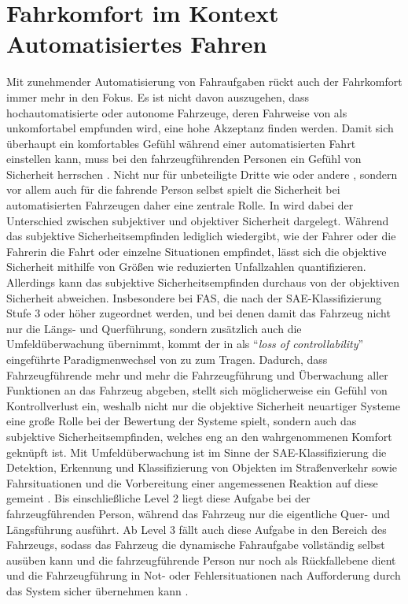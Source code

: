 \section{Fahrkomfort im Kontext Automatisiertes Fahren}\label{sec:fahrkomfort}
Mit zunehmender Automatisierung von Fahraufgaben rückt auch der Fahrkomfort immer mehr in den Fokus. Es ist nicht davon auszugehen, dass hochautomatisierte oder autonome Fahrzeuge, deren Fahrweise von  als unkomfortabel empfunden wird, eine hohe Akzeptanz finden werden. Damit sich überhaupt ein komfortables Gefühl während einer automatisierten Fahrt einstellen kann, muss bei den fahrzeugführenden Personen ein Gefühl von Sicherheit herrschen \cite{Festner.2019}. Nicht nur für unbeteiligte Dritte wie  oder andere , sondern vor allem auch für die fahrende Person selbst spielt die Sicherheit bei automatisierten Fahrzeugen daher eine zentrale Rolle. In \cite{Festner.2019} wird dabei der Unterschied zwischen subjektiver und objektiver Sicherheit dargelegt. Während das subjektive Sicherheitsempfinden lediglich wiedergibt, wie der Fahrer oder die Fahrerin die Fahrt oder einzelne Situationen empfindet, lässt sich die objektive Sicherheit mithilfe von Größen wie reduzierten Unfallzahlen quantifizieren. Allerdings kann das subjektive Sicherheitsempfinden durchaus von der objektiven Sicherheit abweichen. Insbesondere bei FAS, die nach der SAE-Klassifizierung \cite{SAETaxonomy.2018} Stufe 3 oder höher zugeordnet werden, und bei denen damit das Fahrzeug nicht nur die Längs- und Querführung, sondern zusätzlich auch die Umfeldüberwachung übernimmt, kommt der in \cite{Elbanhawi.2015} als ``\textit{loss of controllability}'' eingeführte Paradigmenwechsel von  zu  zum Tragen. Dadurch, dass Fahrzeugführende mehr und mehr die Fahrzeugführung und Überwachung aller Funktionen an das Fahrzeug abgeben, stellt sich möglicherweise ein Gefühl von Kontrollverlust ein, weshalb nicht nur die objektive Sicherheit neuartiger Systeme eine große Rolle bei der Bewertung der Systeme spielt, sondern auch das subjektive Sicherheitsempfinden, welches eng an den wahrgenommenen Komfort geknüpft ist. Mit Umfeldüberwachung ist im Sinne der SAE-Klassifizierung die Detektion, Erkennung und Klassifizierung von Objekten im Straßenverkehr sowie Fahrsituationen und die Vorbereitung einer angemessenen Reaktion auf diese gemeint \cite{SAETaxonomy.2018}. Bis einschließliche Level 2 liegt diese Aufgabe bei der fahrzeugführenden Person, während das Fahrzeug nur die eigentliche Quer- und Längsführung ausführt. Ab Level 3 fällt auch diese Aufgabe in den Bereich des Fahrzeugs, sodass das Fahrzeug die dynamische Fahraufgabe vollständig selbst ausüben kann und die fahrzeugführende Person nur noch als Rückfallebene dient und die Fahrzeugführung in Not- oder Fehlersituationen nach Aufforderung durch das System sicher übernehmen kann \cite{SAETaxonomy.2018}.

